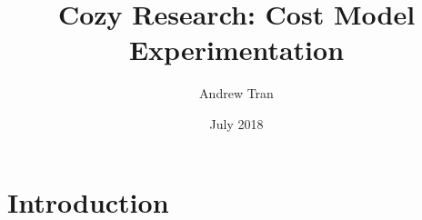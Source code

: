 \documentclass[12pt]{article}
\title{Cozy Research: Cost Model Experimentation}
\author{Andrew Tran}
\date{July 2018}
\begin{document}
\maketitle

\section{Introduction}

\end{document}
